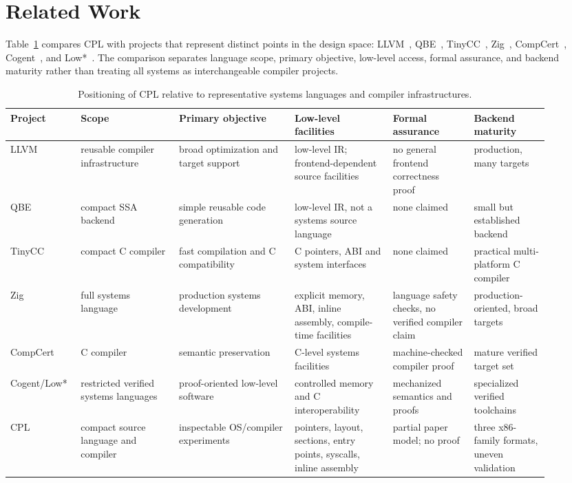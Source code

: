 \documentclass[10pt,twocolumn]{article}
\begin{document}
\section{Related Work}

\par Table~\ref{tab:related-comparison} compares CPL with projects that represent distinct points in the design space: LLVM~\cite{lattner2004llvm}, QBE~\cite{qbe}, TinyCC~\cite{tinycc}, Zig~\cite{ziglangref}, CompCert~\cite{leroy2009compcert,compcert}, Cogent~\cite{oconnor2016cogent}, and Low*~\cite{protzenko2017lowstar}. The comparison separates language scope, primary objective, low-level access, formal assurance, and backend maturity rather than treating all systems as interchangeable compiler projects.

\begin{table}[t]
\centering
\footnotesize
\setlength{\tabcolsep}{3pt}
\caption{Positioning of CPL relative to representative systems languages and compiler infrastructures.}
\label{tab:related-comparison}
\begin{tabular}{p{0.10\linewidth}p{0.17\linewidth}p{0.20\linewidth}p{0.17\linewidth}p{0.14\linewidth}p{0.13\linewidth}}
\toprule
Project & Scope & Primary objective & Low-level facilities & Formal assurance & Backend maturity \\
\midrule
LLVM & reusable compiler infrastructure & broad optimization and target support & low-level IR; frontend-dependent source facilities & no general frontend correctness proof & production, many targets \\
QBE & compact SSA backend & simple reusable code generation & low-level IR, not a systems source language & none claimed & small but established backend \\
TinyCC & compact C compiler & fast compilation and C compatibility & C pointers, ABI and system interfaces & none claimed & practical multi-platform C compiler \\
Zig & full systems language & production systems development & explicit memory, ABI, inline assembly, compile-time facilities & language safety checks, no verified compiler claim & production-oriented, broad targets \\
CompCert & C compiler & semantic preservation & C-level systems facilities & machine-checked compiler proof & mature verified target set \\
Cogent/Low* & restricted verified systems languages & proof-oriented low-level software & controlled memory and C interoperability & mechanized semantics and proofs & specialized verified toolchains \\
CPL & compact source language and compiler & inspectable OS/compiler experiments & pointers, layout, sections, entry points, syscalls, inline assembly & partial paper model; no proof & three x86-family formats, uneven validation \\
\bottomrule
\end{tabular}
\end{table}
\end{document}
